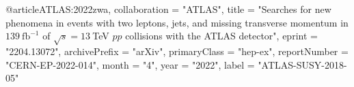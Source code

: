 @article{ATLAS:2022zwa,
    collaboration = "ATLAS",
    title = "{Searches for new phenomena in events with two leptons, jets, and missing transverse momentum in $139~\text{fb}^{-1}$ of $\sqrt{s}=13~$TeV $pp$ collisions with the ATLAS detector}",
    eprint = "2204.13072",
    archivePrefix = "arXiv",
    primaryClass = "hep-ex",
    reportNumber = "CERN-EP-2022-014",
    month = "4",
    year = "2022",
    label = "ATLAS-SUSY-2018-05"
}

